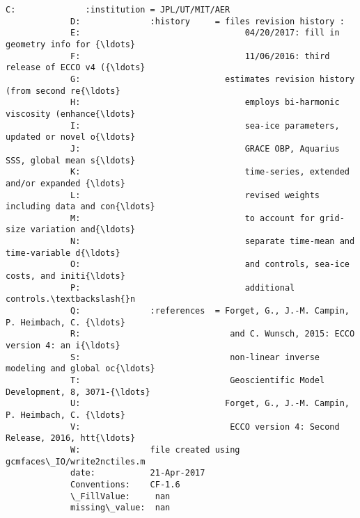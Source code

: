 \documentclass[11pt]{article}
\begin{document}
\begin{Verbatim}[commandchars=\\\{\}]
             C:              :institution = JPL/UT/MIT/AER
             D:              :history     = files revision history :
             E:                                 04/20/2017: fill in geometry info for {\ldots}
             F:                                 11/06/2016: third release of ECCO v4 ({\ldots}
             G:                             estimates revision history (from second re{\ldots}
             H:                                 employs bi-harmonic viscosity (enhance{\ldots}
             I:                                 sea-ice parameters, updated or novel o{\ldots}
             J:                                 GRACE OBP, Aquarius SSS, global mean s{\ldots}
             K:                                 time-series, extended and/or expanded {\ldots}
             L:                                 revised weights including data and con{\ldots}
             M:                                 to account for grid-size variation and{\ldots}
             N:                                 separate time-mean and time-variable d{\ldots}
             O:                                 and controls, sea-ice costs, and initi{\ldots}
             P:                                 additional controls.\textbackslash{}n 
             Q:              :references  = Forget, G., J.-M. Campin, P. Heimbach, C. {\ldots}
             R:                              and C. Wunsch, 2015: ECCO version 4: an i{\ldots}
             S:                              non-linear inverse modeling and global oc{\ldots}
             T:                              Geoscientific Model Development, 8, 3071-{\ldots}
             U:                             Forget, G., J.-M. Campin, P. Heimbach, C. {\ldots}
             V:                              ECCO version 4: Second Release, 2016, htt{\ldots}
             W:              file created using gcmfaces\_IO/write2nctiles.m
             date:           21-Apr-2017
             Conventions:    CF-1.6
             \_FillValue:     nan
             missing\_value:  nan
\end{Verbatim}
            

    
    
    
    
\end{document}
